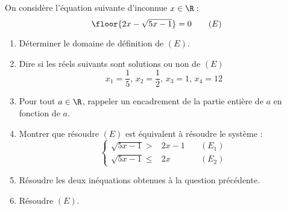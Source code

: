 \documentclass[a4paper, 11pt,reqno]{article}
\begin{document}
\begin{exercice}
On considère l'équation suivante d'inconnue $x\in \R : $ 
$$\floor{2x-\sqrt{5x-1}} =0 \quad \quad (E)$$
\begin{enumerate}
\item Déterminer le domaine de définition de $(E)$. 
\item Dire si les réels suivants sont solutions ou non de $(E)$
$$x_1 = \frac{1}{5}, \, x_2 = \frac{1}{2}, \, x_3 =1,\, x_4=12$$
\item Pour tout $a\in \R$, rappeler  un encadrement de la partie entière de $a$ en fonction de $a$. 
\item Montrer que résoudre $(E)$ est équivalent à résoudre le système :
$$\left\{\begin{array}{clc}
\sqrt{5x-1} >&2x-1 &\quad(E_1)\\ 
\sqrt{5x-1} \leq &2x&\quad(E_2)
\end{array}\right.
$$
\item Résoudre les deux inéquations obtenues à la question précédente. 
\item Résoudre $(E)$. 
\end{enumerate}
\end{exercice}
\end{document}
